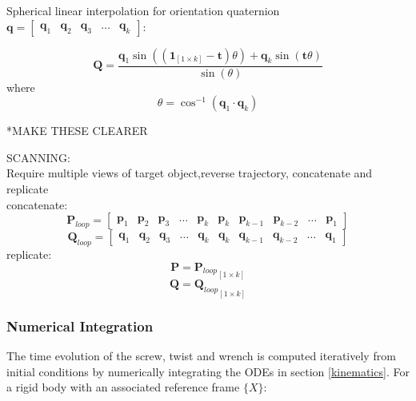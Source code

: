 Spherical linear interpolation for orientation quaternion $\mathbf{q}= \begin{bmatrix}
													\mathbf{q}_1 & \mathbf{q}_2 & \mathbf{q}_3 & \dots & \mathbf{q}_k
												\end{bmatrix}$:

\begin{equation} \label{slerp}
	\mathbf{Q} = \frac{\mathbf{q}_1\sin((\mathbf{1}_{[1 \times k]}-\mathbf{t})\theta) + \mathbf{q}_k\sin(\mathbf{t}\theta)}{\sin(\theta)}
\end{equation}
where
\begin{equation}
	\theta = \cos^{-1}(\mathbf{q}_1 \cdot \mathbf{q}_k)
\end{equation}

*MAKE THESE CLEARER

SCANNING:\\
Require multiple views of target object,reverse trajectory, concatenate and replicate\\
concatenate:\\
\begin{equation}
	\mathbf{P}_{loop}= 
	\begin{bmatrix}
		\mathbf{p}_1 & \mathbf{p}_2 & \mathbf{p}_3 & \dots & \mathbf{p}_k &
		\mathbf{p}_{k} & \mathbf{p}_{k-1} & \mathbf{p}_{k-2} & \dots & \mathbf{p}_1
	\end{bmatrix}
\end{equation}
\begin{equation}
	\mathbf{Q}_{loop}= 
	\begin{bmatrix}
		\mathbf{q}_1 & \mathbf{q}_2 & \mathbf{q}_3 & \dots & \mathbf{q}_k &
		\mathbf{q}_{k} & \mathbf{q}_{k-1} & \mathbf{q}_{k-2} & \dots & \mathbf{q}_1
	\end{bmatrix}
\end{equation}
replicate:
\begin{equation}
	\mathbf{P} = {\mathbf{P}_{loop}}_{[1 \times k]}
\end{equation}
\begin{equation}
	\mathbf{Q} = {\mathbf{Q}_{loop}}_{[1 \times k]}
\end{equation}



\subsubsection{Numerical Integration}
The time evolution of the screw, twist and wrench is computed iteratively from initial conditions by numerically integrating the ODEs in section \ref{kinematics}. For a rigid body with an associated reference frame $\{X\}$:

